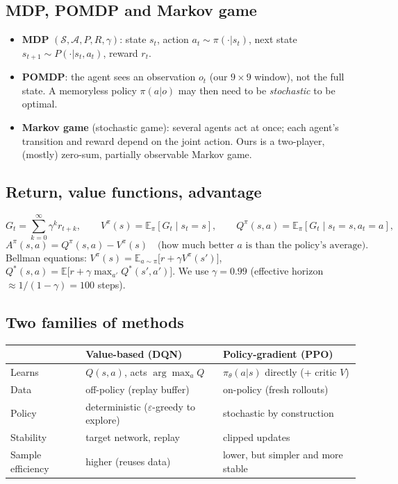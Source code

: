 \documentclass[11pt,a4paper]{article}
\newcommand{\E}{\mathbb{E}}
\begin{document}
\subsection{MDP, POMDP and Markov game}
\begin{itemize}
  \item \textbf{MDP} $(\mathcal{S},\mathcal{A},P,R,\gamma)$: state $s_t$, action $a_t\sim\pi(\cdot|s_t)$,
        next state $s_{t+1}\sim P(\cdot|s_t,a_t)$, reward $r_t$.
  \item \textbf{POMDP}: the agent sees an observation $o_t$ (our $9\times9$ window), not the full state.
        A memoryless policy $\pi(a|o)$ may then need to be \emph{stochastic} to be optimal.
  \item \textbf{Markov game} (stochastic game): several agents act at once; each agent's transition
        and reward depend on the joint action. Ours is a two-player, (mostly) zero-sum, partially
        observable Markov game.
\end{itemize}

\subsection{Return, value functions, advantage}
\[
G_t=\sum_{k=0}^{\infty}\gamma^k r_{t+k},\qquad
V^\pi(s)=\E_\pi[G_t\mid s_t=s],\qquad
Q^\pi(s,a)=\E_\pi[G_t\mid s_t=s,a_t=a],
\]
\[
A^\pi(s,a)=Q^\pi(s,a)-V^\pi(s)\quad\text{(how much better $a$ is than the policy's average).}
\]
Bellman equations:
$V^\pi(s)=\E_{a\sim\pi}\big[r+\gamma V^\pi(s')\big]$,\;
$Q^*(s,a)=\E\big[r+\gamma\max_{a'}Q^*(s',a')\big]$.
We use $\gamma=0.99$ (effective horizon $\approx 1/(1-\gamma)=100$ steps).

\subsection{Two families of methods}
\begin{center}
\begin{tabular}{lll}
\toprule
 & \textbf{Value-based (DQN)} & \textbf{Policy-gradient (PPO)}\\
\midrule
Learns & $Q(s,a)$, acts $\arg\max_a Q$ & $\pi_\theta(a|s)$ directly (+ critic $V$)\\
Data & off-policy (replay buffer) & on-policy (fresh rollouts)\\
Policy & deterministic ($\varepsilon$-greedy to explore) & stochastic by construction\\
Stability & target network, replay & clipped updates\\
Sample efficiency & higher (reuses data) & lower, but simpler and more stable\\
\bottomrule
\end{tabular}
\end{center}
\end{document}
